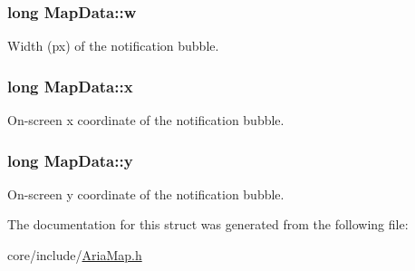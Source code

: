 \subsubsection[{w}]{\setlength{\rightskip}{0pt plus 5cm}long Map\+Data\+::w}\label{structMapData_a7cc187013c2f397ddbb575ac065fe25e}
Width (px) of the notification bubble. \hypertarget{structMapData_a52a37fc0f0cb1564824d68a86d0d4c97}{}
\subsubsection[{x}]{\setlength{\rightskip}{0pt plus 5cm}long Map\+Data\+::x}\label{structMapData_a52a37fc0f0cb1564824d68a86d0d4c97}
On-\/screen x coordinate of the notification bubble. \hypertarget{structMapData_ace819161d4cd3db76cac2f104a9fb78d}{}
\subsubsection[{y}]{\setlength{\rightskip}{0pt plus 5cm}long Map\+Data\+::y}\label{structMapData_ace819161d4cd3db76cac2f104a9fb78d}
On-\/screen y coordinate of the notification bubble. 

The documentation for this struct was generated from the following file\+:\begin{DoxyCompactItemize}
\item 
core/include/\hyperlink{AriaMap_8h}{Aria\+Map.\+h}\end{DoxyCompactItemize}
